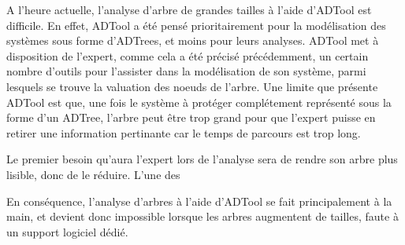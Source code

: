 		A l'heure actuelle, l'analyse d'arbre de grandes tailles à l'aide d'ADTool est difficile. En effet, ADTool a été pensé prioritairement pour la modélisation des systèmes sous forme d'ADTrees, et moins pour leurs analyses. ADTool met à disposition de l'expert, comme cela a été précisé précédemment, un certain nombre d'outils pour l'assister dans la modélisation de son système, parmi lesquels se trouve la valuation des noeuds de l'arbre. Une limite que présente ADTool est que, une fois le système à protéger complétement représenté sous la forme d'un ADTree, l'arbre peut être trop grand pour que l'expert puisse en retirer une information pertinante car le temps de parcours est trop long. 

		Le premier besoin qu'aura l'expert lors de l'analyse sera de rendre son arbre plus lisible, donc de le réduire. L'une des 

		En conséquence, l'analyse d'arbres à l'aide d'ADTool se fait principalement à la main, et devient donc impossible lorsque les arbres augmentent de tailles, faute à un support logiciel dédié.

		

